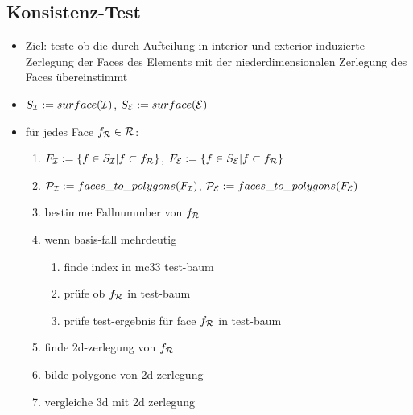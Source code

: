 \documentclass[a4paper, 11pt]{scrartcl}
\begin{document}
\subsection*{Konsistenz-Test}
\begin{itemize}
\item Ziel: teste ob die durch Aufteilung in interior und exterior induzierte Zerlegung der Faces des Elements mit der niederdimensionalen Zerlegung des Faces übereinstimmt
\item $S_{\cal I}:=surface({\cal I})$, $S_{\cal E}:=surface({\cal E})$
\item für jedes Face $f_{\cal R}\in{\cal R}$:
  \begin{enumerate}
  \item $F_{\cal I}:=\lbrace f\in S_{\cal I} | f\subset f_{\cal R}\rbrace$, $F_{\cal E}:=\lbrace f\in S_{\cal E} | f\subset f_{\cal R}\rbrace$
  \item ${\cal P}_{\cal I}:=faces\_to\_polygons(F_{\cal I})$, ${\cal P}_{\cal E}:=faces\_to\_polygons(F_{\cal E})$
  \item bestimme Fallnummber von $f_{\cal R}$
  \item wenn basis-fall mehrdeutig
    \begin{enumerate}
    \item finde index in mc33 test-baum
    \item prüfe ob $f_{\cal R}$ in test-baum
    \item prüfe test-ergebnis für face $f_{\cal R}$ in test-baum
    \end{enumerate}
  \item finde 2d-zerlegung von $f_{\cal R}$
  \item bilde polygone von 2d-zerlegung
  \item vergleiche 3d mit 2d zerlegung
  \end{enumerate}
\end{itemize}
\end{document}
